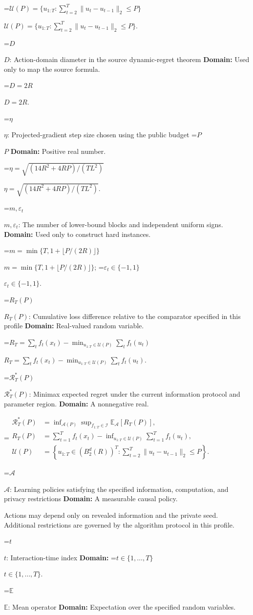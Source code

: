 \documentclass[10pt,a4paper]{article}
\newcommand{\AtlasMath}[1]{\par\begingroup\centering\setbox0=\hbox{$\displaystyle #1$}\ifdim\wd0>1.4\linewidth\typeout{ATLAS WIDE FORMULA: \the\wd0}\fi\ifdim\wd0>\linewidth\resizebox{\linewidth}{!}{\box0}\else\box0\fi\par\endgroup}
\newcommand{\AtlasInlineMath}[1]{\begingroup\setbox0=\hbox{$#1$}\ifdim\wd0>.4\linewidth\endgroup\AtlasMath{#1}\else\endgroup$#1$\fi}
\begin{document}
\AtlasInlineMath{\mathcal U(P)=\{u_{1:T}:\sum_{t=2}^T\|u_t-u_{t-1}\|_2\le P\}}.

\AtlasInlineMath{D}: Action-domain diameter in the source dynamic-regret theorem \textbf{Domain:} Used only to map the source formula.

\AtlasInlineMath{D=2R}.

\AtlasInlineMath{\eta}: Projected-gradient step size chosen using the public budget \AtlasInlineMath{P} \textbf{Domain:} Positive real number.

\AtlasInlineMath{\eta=\sqrt{(14R^2+4RP)/(TL^2)}}.

\AtlasInlineMath{m,\varepsilon_t}: The number of lower-bound blocks and independent uniform signs. \textbf{Domain:} Used only to construct hard instances.

\AtlasInlineMath{m=\min\{T,1+\lfloor P/(2R)\rfloor\}}; \AtlasInlineMath{\varepsilon_t\in\{-1,1\}}.

\AtlasInlineMath{R_T(P)}: Cumulative loss difference relative to the comparator specified in this profile \textbf{Domain:} Real-valued random variable.

\AtlasInlineMath{R_T=\sum_tf_t(x_t)-\min_{u_{1:T}\in\mathcal U(P)}\sum_tf_t(u_t)}.

\AtlasInlineMath{\mathcal R_T^*(P)}: Minimax expected regret under the current information protocol and parameter region. \textbf{Domain:} A nonnegative real.


\AtlasMath{\begin{aligned}\mathcal R_T^*(P)&=\inf_{\mathcal A(P)}\sup_{f_{1:T}\in\mathcal I}\mathbb E_{\mathcal A}[R_T(P)],\\ R_T(P)&=\sum_{t=1}^T f_t(x_t)-\inf_{u_{1:T}\in\mathcal U(P)}\sum_{t=1}^T f_t(u_t),\\ \mathcal U(P)&=\left\{u_{1:T}\in(B_2^d(R))^T:\sum_{t=2}^T\|u_t-u_{t-1}\|_2\le P\right\}.\end{aligned}}


\AtlasInlineMath{\mathcal A}: Learning policies satisfying the specified information, computation, and privacy restrictions \textbf{Domain:} A measurable causal policy.

Actions may depend only on revealed information and the private seed. Additional restrictions are governed by the algorithm protocol in this profile.

\AtlasInlineMath{t}: Interaction-time index \textbf{Domain:} \AtlasInlineMath{t\in\{1,\ldots,T\}}.

\AtlasInlineMath{\mathbb E}: Mean operator \textbf{Domain:} Expectation over the specified random variables.
\end{document}
